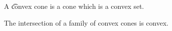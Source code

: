 


A \t{convex cone} is a cone which is a convex set.

\begin{prop}
  The intersection of a family of convex cones is convex.
\end{prop}
